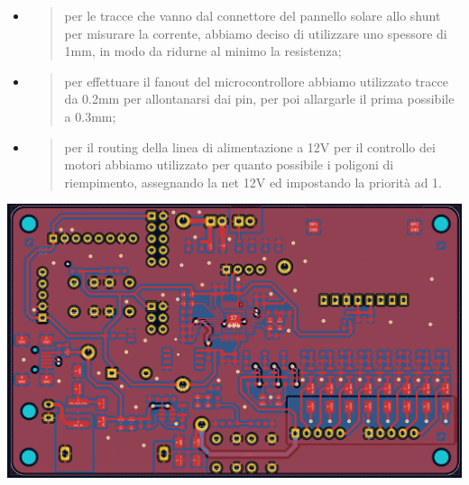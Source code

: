 \begin{itemize}
\item
  \begin{quote}
  per le tracce che vanno dal connettore del pannello solare allo shunt
  per misurare la corrente, abbiamo deciso di utilizzare uno spessore di
  1mm, in modo da ridurne al minimo la resistenza;
  \end{quote}
\item
  \begin{quote}
  per effettuare il fanout del microcontrollore abbiamo utilizzato
  tracce da 0.2mm per allontanarsi dai pin, per poi allargarle il prima
  possibile a 0.3mm;
  \end{quote}
\item
  \begin{quote}
  per il routing della linea di alimentazione a 12V per il controllo dei
  motori abbiamo utilizzato per quanto possibile i poligoni di
  riempimento, assegnando la net 12V ed impostando la priorità ad 1.
  \end{quote}
\end{itemize}

\begin{center}
\includegraphics[scale=0.2]{figures/image77.png}
\captionsetup{type=figure}
\end{center}

